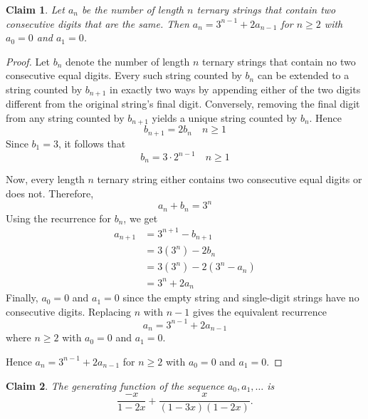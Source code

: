 \documentclass{article}
\newtheorem{claim}{Claim}
\begin{document}
\begin{claim}
    Let $a_n$ be the number of length $n$ ternary strings that contain two consecutive digits that are the same. 
    Then $a_n = 3^{n-1} + 2a_{n-1}$ for $n \ge 2$ with $a_0 = 0$ and $a_1 = 0$.
\end{claim}

\begin{proof}
    Let $b_n$ denote the number of length $n$ ternary strings that contain no two consecutive equal digits. 
    Every such string counted by $b_n$ can be extended to a string counted by $b_{n+1}$ in exactly two ways by 
    appending either of the two digits different from the original string's final digit. Conversely, removing 
    the final digit from any string counted by $b_{n+1}$ yields a unique string counted by $b_n$. Hence
    \[
    b_{n+1} = 2b_n \quad n \ge 1
    \]
    Since $b_1 = 3$, it follows that
    \[
    b_n = 3 \cdot 2^{n-1} \quad n \ge 1
    \]

    \medskip

    Now, every length $n$ ternary string either contains two consecutive equal digits or does not. Therefore,
    \[
    a_n + b_n = 3^n
    \]
    Using the recurrence for $b_n$, we get
    \[
    \begin{aligned}
    a_{n+1} &= 3^{n+1} - b_{n+1} \\
    &= 3(3^n) - 2b_n \\
    &= 3(3^n) - 2(3^n - a_n) \\
    &= 3^n + 2a_n
    \end{aligned}
    \]
    Finally, $a_0 = 0$ and $a_1 = 0$ since the empty string and single-digit strings have no consecutive 
    digits. Replacing $n$ with $n - 1$ gives the equivalent recurrence
    \[
    a_n = 3^{n-1} + 2a_{n-1}
    \]
    where $n \ge 2$ with $a_0 = 0$ and $a_1 = 0$.
    
    \medskip

    Hence $a_n = 3^{n-1} + 2a_{n-1}$ for $n \ge 2$ with $a_0 = 0$ and $a_1 = 0$.
\end{proof}

\begin{claim}
    The generating function of the sequence $a_0, a_1, \dots$ is
    \[
    \frac{-x}{1 - 2x} + \frac{x}{(1 - 3x)(1 - 2x)}.
    \]
\end{claim}
\end{document}

